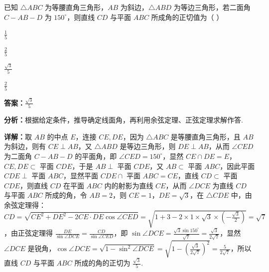 \begin{question}[points=5]
已知 $\triangle ABC$ 为等腰直角三角形，$AB$ 为斜边，$\triangle ABD$ 为等边三角形，若二面角 $C-AB-D$ 为 $150^\circ$，则直线 $CD$ 与平面 $ABC$ 所成角的正切值为（ ）
\begin{choices}
  \item $\frac{1}{5}$
  \item $\frac{2}{5}$
  \item $\frac{\sqrt{3}}{5}$
  \item $\frac{2}{5}$
\end{choices}
\begin{solution}
\textbf{答案：}$\frac{\sqrt{3}}{5}$

\textbf{分析：}根据给定条件，推导确定线面角，再利用余弦定理、正弦定理求解作答.

\textbf{详解：}取 $AB$ 的中点 $E$，连接 $CE,DE$，因为 $\triangle ABC$ 是等腰直角三角形，且 $AB$ 为斜边，则有 $CE\perp AB$，又 $\triangle ABD$ 是等边三角形，则 $DE\perp AB$，从而 $\angle CED$ 为二面角 $C-AB-D$ 的平面角，即 $\angle CED=150^\circ$，显然 $CE\cap DE=E$，$CE,DE\subset$ 平面 $CDE$，于是 $AB\perp$ 平面 $CDE$，又 $AB\subset$ 平面 $ABC$，因此平面 $CDE\perp$ 平面 $ABC$，显然平面 $CDE\cap$ 平面 $ABC=CE$，直线 $CD\subset$ 平面 $CDE$，则直线 $CD$ 在平面 $ABC$ 内的射影为直线 $CE$，从而 $\angle DCE$ 为直线 $CD$ 与平面 $ABC$ 所成的角，令 $AB=2$，则 $CE=1$，$DE=\sqrt{3}$，在 $\triangle CDE$ 中，由余弦定理得：$CD=\sqrt{CE^2+DE^2-2CE\cdot DE\cos\angle CED}=\sqrt{1+3-2\times1\times\sqrt{3}\times(-\frac{\sqrt{3}}{2})}=\sqrt{7}$，由正弦定理得 $\frac{DE}{\sin\angle DCE}=\frac{CD}{\sin\angle CED}$，即 $\sin\angle DCE=\frac{\sqrt{3}\sin150^\circ}{\sqrt{7}}=\frac{\sqrt{3}}{2\sqrt{7}}$，显然 $\angle DCE$ 是锐角，$\cos\angle DCE=\sqrt{1-\sin^2\angle DCE}=\sqrt{1-(\frac{\sqrt{3}}{2\sqrt{7}})^2}=\frac{5}{2\sqrt{7}}$，所以直线 $CD$ 与平面 $ABC$ 所成的角的正切为 $\frac{\sqrt{3}}{5}$.
\end{solution}
\end{question}

